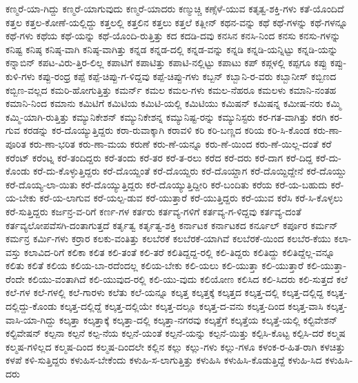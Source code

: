{ಕಣ್ಮರೆ-ಯಾ-ಗಿದ್ದು
ಕಣ್ಮರೆ-ಯಾಗುವುದು
ಕಣ್ಮರೆ-ಯಾದರು
ಕಣ್ಮುಚ್ಚಿ
ಕಣ್ಸೆಳೆ-ಯುವ
ಕತೃತ್ವ-ಶಕ್ತಿ-ಗಳು
ಕತೆ-ಯೊಂದಿದೆ
ಕತ್ತಲ
ಕತ್ತಲ-ಕೋಣೆ-ಯಲ್ಲಿದ್ದು
ಕತ್ತಲಲ್ಲಿ
ಕತ್ತಲಿನ
ಕತ್ತಲು
ಕತ್ತಲೆ
ಕತ್ಲೀನ್
ಕಥನ-ವನ್ನು
ಕಥೆ
ಕಥೆ-ಗಳನ್ನು
ಕಥೆ-ಗಳನ್ನೂ
ಕಥೆ-ಗಳು
ಕಥೆಯ
ಕಥೆ-ಯನ್ನು
ಕಥೆ-ಯೊಂದಿ-ರುತ್ತಿತ್ತು
ಕದ
ಕದಡಿ-ದವು
ಕನಸಿನ
ಕನಸಿ-ನಿಂದ
ಕನಸು
ಕನಸು-ಗಳನ್ನು
ಕನಿಷ್ಟ
ಕನಿಷ್ಠ
ಕನಿಷ್ಠ-ವಾಗಿ
ಕನಿಷ್ಠ-ವಾಗಿತ್ತು
ಕನ್ನಡ
ಕನ್ನಡ-ದಲ್ಲಿ
ಕನ್ನಡ-ವನ್ನು
ಕನ್ನಡಿ
ಕನ್ನಡಿ-ಯನ್ನಿಟ್ಟು
ಕನ್ನಡಿ-ಯನ್ನು
ಕನ್ನಾಬಿನ್
ಕಪಟ-ವಿರು-ತ್ತಿರ-ಲಿಲ್ಲ
ಕಪಾಟಿಗೆ
ಕಪಾಟಿತ್ತು
ಕಪಾಟಿ-ನಲ್ಲಿಟ್ಟು
ಕಪಾಟು
ಕಪ್
ಕಪ್ಗಳಲ್ಲಿ
ಕಪ್ಪಗೂ
ಕಪ್ಪು
ಕಪ್ಪು-ಕುಳಿ-ಗಳು
ಕಪ್ಪು-ರಂಧ್ರ
ಕಪ್ಪೆ
ಕಪ್ಪೆ-ಚಿಪ್ಪು-ಗ-ಳಿದ್ದವು
ಕಪ್ಪೆ-ಚಿಪ್ಪು-ಗಳು
ಕಬ್ಬನ್
ಕಬ್ಬಾನಿ-ರ-ವರು
ಕಬ್ಬಾನೀಸ್
ಕಬ್ಬಿಣದ
ಕಬ್ಬಿಣ-ವಲ್ಲದ
ಕಮರಿ-ಹೋಗುತ್ತಿತ್ತು
ಕಮರ್ನ್
ಕಮಲ
ಕಮಲ-ಗಳು
ಕಮಲ-ನೆಹರೂ
ಕಮಲಳು
ಕಮಾನಿ-ನಂತಹ
ಕಮಾನಿ-ನಿಂದ
ಕಮಾನು
ಕಮಿಟಿಗೆ
ಕಮಿಟಿಯ
ಕಮಿಟಿ-ಯಲ್ಲಿ
ಕಮಿಟಿಯು
ಕಮಿಷನ್
ಕಮಿಷನ್ನ
ಕಮೀಷ-ನರು
ಕಮ್ಮಿ
ಕಮ್ಮಿ-ಯಾಗಿ-ರುತ್ತಿತ್ತು
ಕಮ್ಯುನಿಕೇಶನ್
ಕಮ್ಯುನಿಕೇಶನ್ನ
ಕಮ್ಯುನಿಷ್ಟ-ರನ್ನು
ಕಮ್ಯುನಿಸ್ಟರು
ಕರ-ಗತ-ವಾಗಿತ್ತು
ಕರಗಿ
ಕರ-ಗುವ
ಕರಡನ್ನು
ಕರ-ದೊಯ್ಯುತ್ತಿದ್ದರು
ಕರಾ-ರುವಾಕ್ಕಾಗಿ
ಕರಾವಳಿ
ಕರಿ
ಕರಿ-ಬಣ್ಣದ
ಕರಿಯ
ಕರಿ-ಸಿ-ಕೊಂಡ
ಕರು-ಣಾ-ಪೂರಿತ
ಕರು-ಣಾ-ಭರಿತ
ಕರು-ಣಾ-ಮಯ
ಕರುಣೆ
ಕರು-ಣೆ-ಯನ್ನೂ
ಕರು-ಣೆ-ಯಿಂದ
ಕರು-ಣೆ-ಯಿಲ್ಲ-ದಂತೆ
ಕರೆ
ಕರೆಂಟ್
ಕರೆಂಟ್ನ
ಕರೆ-ತಂದಿದ್ದರು
ಕರೆ-ತಂದು
ಕರೆ-ತರ
ಕರೆ-ತ-ರಲು
ಕರೆದ
ಕರೆ-ದರು
ಕರೆ-ದಾಗ
ಕರೆ-ದಿದ್ದ
ಕರೆ-ದು-ಕೊಂಡು
ಕರೆ-ದು-ಕೊಳ್ಳುತ್ತಿದ್ದರು
ಕರೆ-ದೊಯ್ದಂತೆ
ಕರೆ-ದೊಯ್ದರು
ಕರೆ-ದೊಯ್ದಾಗ
ಕರೆ-ದೊಯ್ದಿದ್ದೇನೆ
ಕರೆ-ದೊಯ್ದು
ಕರೆ-ದೊಯ್ಯ-ಲಾ-ಯಿತು
ಕರೆ-ದೊಯ್ಯುತ್ತಿದ್ದರು
ಕರೆ-ದೊಯ್ಯುತ್ತಿದ್ದೀರಿ
ಕರೆ-ಬಂದಿತು
ಕರೆಯ
ಕರೆ-ಯ-ಬಹುದು
ಕರೆ-ಯ-ಬೇಕು
ಕರೆ-ಯ-ಲಾಗುವ
ಕರೆ-ಯಲ್ಪ-ಡುವ
ಕರೆ-ಯುತ್ತಾರೆ
ಕರೆ-ಯುತ್ತಿದ್ದರು
ಕರೆ-ಯುವ
ಕರೆಸಿ
ಕರೆ-ಸಿ-ಕೊಳ್ಳಲು
ಕರೆ-ಸುತ್ತಿದ್ದರು
ಕರ್ಜನ್ರ-ವ-ರಿಗೆ
ಕರ್ಣ-ಗಳ
ಕರ್ತರು
ಕರ್ತವ್ಯ-ಗಳಿಗೆ
ಕರ್ತವ್ಯ-ಗ-ಳಿದ್ದವು
ಕರ್ತವ್ಯ-ದಂತೆ
ಕರ್ತವ್ಯಲೋಪವೆಸಗಿ-ದಂತಾಗುತ್ತದೆ
ಕರ್ತೃತ್ವ
ಕರ್ತೃತ್ವ-ಶಕ್ತಿ
ಕರ್ನಾಟಕ
ಕರ್ನಾಟಕದ
ಕರ್ನೂಲ್
ಕರ್ಪೂರ
ಕರ್ಮನ್
ಕರ್ಮನ್ರ
ಕರ್ಮಿ-ಗಳು
ಕರ್ರಾರ
ಕಲಕು-ವಂತಿತ್ತು
ಕಲಬೆರಕೆ
ಕಲಬೆರಕೆ-ಯಾಗಿವೆ
ಕಲಬೆರಕೆ-ಯಿಂದ
ಕಲಬೆರ-ಕೆಯು
ಕಲಾ-ವಸ್ತು
ಕಲಾವಿದ-ರಿಗೆ
ಕಲಿಕಾ
ಕಲಿತ
ಕಲಿ-ತಂತೆ
ಕಲಿ-ತರೆ
ಕಲಿತಿದ್ದದ್ದ-ರಲ್ಲಿ
ಕಲಿ-ತಿದ್ದರು
ಕಲಿತಿದ್ದು
ಕಲಿತಿದ್ದೆಲ್ಲ-ವನ್ನೂ
ಕಲಿತು
ಕಲಿತೆ
ಕಲಿಯ
ಕಲಿಯ-ಬಾ-ರದೆಂದಲ್ಲ
ಕಲಿಯ-ಬೇಕು
ಕಲಿ-ಯಲು
ಕಲಿ-ಯುತ್ತಾ
ಕಲಿ-ಯುತ್ತಾರೆ
ಕಲಿ-ಯುತ್ತಾ-ರೆಂದೇ
ಕಲಿಯು-ವಂತಾಗಿದೆ
ಕಲಿ-ಯುವುದ-ರಲ್ಲಿ
ಕಲಿ-ಯು-ವುದು
ಕಲಿಯೋಣ
ಕಲಿಸಿದ
ಕಲಿ-ಸಿದರು
ಕಲಿ-ಸುತ್ತದೆ
ಕಲೆ
ಕಲೆ-ಗಳ
ಕಲೆ-ಗಳಲ್ಲಿ
ಕಲೆ-ಗಾರಳು
ಕಲೆತು
ಕಲೆ-ಯನ್ನೂ
ಕಲ್ಕತ್ತ
ಕಲ್ಕತ್ತಕ್ಕೆ
ಕಲ್ಕತ್ತದ
ಕಲ್ಕತ್ತ-ದಲ್ಲಿ
ಕಲ್ಕತ್ತ-ದಲ್ಲಿದ್ದ
ಕಲ್ಕತ್ತ-ದಲ್ಲಿದ್ದು-ಕೊಂಡು
ಕಲ್ಕತ್ತ-ದಲ್ಲಿದ್ದೆ
ಕಲ್ಕತ್ತ-ದಲ್ಲಿಯೇ
ಕಲ್ಕತ್ತ-ದಲ್ಲೂ
ಕಲ್ಕತ್ತ-ದ-ವನು
ಕಲ್ಕತ್ತ-ದಿಂದ
ಕಲ್ಕತ್ತ-ವಾಸಿ
ಕಲ್ಕತ್ತ-ವಾಸಿ-ಯಾ-ಗಿದ್ದು
ಕಲ್ಕತ್ತಾ
ಕಲ್ಕತ್ತಾಕ್ಕೆ
ಕಲ್ಕತ್ತಾ-ದಲ್ಲಿ
ಕಲ್ಕತ್ತಾ-ನಗರವು
ಕಲ್ಕತ್ತೆಗೆ
ಕಲ್ಕತ್ತೆಯ
ಕಲ್ಕತ್ತೆ-ಯಲ್ಲಿ
ಕಲ್ಟಿವೇಶನ್
ಕಲ್ಟಿವೇಷನ್
ಕಲ್ಪನಾ
ಕಲ್ಪನೆ
ಕಲ್ಪ-ನೆಯ
ಕಲ್ಪನೆ-ಯಂತೆ
ಕಲ್ಪನೆ-ಯನ್ನು
ಕಲ್ಪನೆ-ಯಿತ್ತು
ಕಲ್ಪಿಸಿ-ಕೊಟ್ಟ
ಕಲ್ಪಿಸಿ-ದರೆ
ಕಲ್ಮಷ
ಕಲ್ಮಷ-ಗಳಿಲ್ಲದ
ಕಲ್ಮಷ-ದಿಂದ
ಕಲ್ಮಷ-ದಿಂದಲೇ
ಕಲ್ಲಿನ
ಕಲ್ಲು
ಕಲ್ಲು-ಗಳು
ಕಲ್ಲು-ಗಳೂ
ಕಳಂಕ-ರ-ಹಿತ-ರಾಗಿ
ಕಳಚಿತ್ತು
ಕಳಪೆ
ಕಳಿ-ಸುತ್ತಿದ್ದರು
ಕಳುಹಿಸ-ಬೇಕೆಂದು
ಕಳುಹಿ-ಸ-ಲಾಗುತ್ತಿತ್ತು
ಕಳುಹಿಸಿ
ಕಳುಹಿಸಿ-ಕೊಡುತ್ತಿದ್ದೆ
ಕಳುಹಿ-ಸಿದ
ಕಳುಹಿಸಿ-ದರು
}

